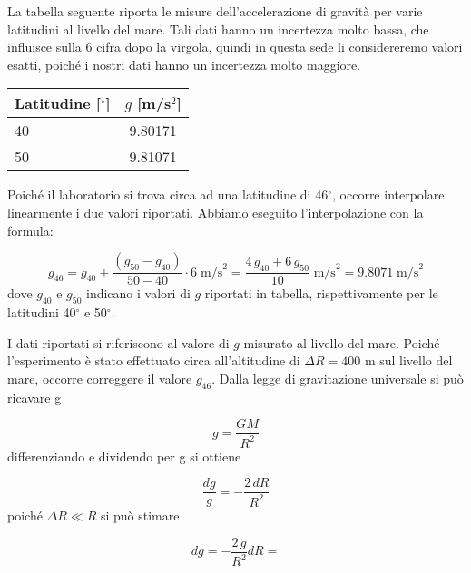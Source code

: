 
La tabella seguente riporta le misure dell'accelerazione di gravità
per varie latitudini al livello del mare. Tali dati hanno un incertezza molto bassa,
che influisce sulla 6 cifra dopo la virgola, quindi in questa sede li considereremo valori esatti,
poiché i nostri dati hanno un incertezza molto maggiore.

\begin{center}
    \begin{tabular}{l c}
        \toprule
        Latitudine [$^\circ$] & $g$ [m/s$^2$] \\
        \midrule
        40 & 9.80171 \\
        50 & 9.81071 \\
        \bottomrule
    \end{tabular}
\end{center}

Poiché il laboratorio si trova circa ad una latitudine di 46$^\circ$, occorre interpolare linearmente i due valori
riportati. Abbiamo eseguito l'interpolazione con la formula:

\begin{equation}
    g_{46} = g_{40} + \frac{(g_{50} - g_{40})}{50 - 40} \cdot 6 \; \text{m/s}^2 = \frac{4\, g_{40} + 6\, g_{50}}{10} \; \text{m/s}^2 =
    9.8071 \; \text{m/s}^2
\end{equation}
%
dove $g_{40}$ e $g_{50}$ indicano i valori di $g$ riportati in tabella, rispettivamente per le latitudini 40$^\circ$ e 50$^\circ$.

I dati riportati si riferiscono al valore di $g$ misurato al livello del mare. Poiché l'esperimento è stato effettuato circa all'altitudine di
$\Delta R = 400$ m sul livello del mare, occorre correggere il valore $g_{46}$. Dalla legge di gravitazione universale si può ricavare g

\begin{equation}
    g = \frac{GM}{R^2}
\end{equation}
%
differenziando e dividendo per g si ottiene

\begin{equation}
    \frac{dg}{g} = - \frac{2\,dR}{R^2}
\end{equation}
%
poiché $\Delta R \ll R$ si può stimare

\begin{equation}
    dg = - \frac{2\,g}{R^2} dR = 
\end{equation}
